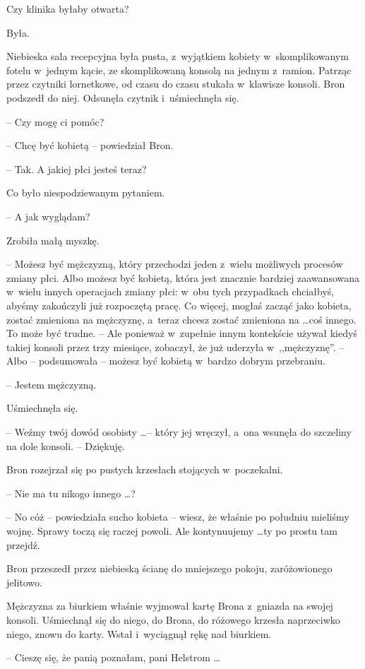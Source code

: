 \documentclass[oneside,polish,11pt,rmheadings]{mwbk}
\begin{document}
Czy klinika byłaby otwarta? 

Była. 

Niebieska sala recepcyjna była pusta, z~wyjątkiem kobiety w~skomplikowanym fotelu w~jednym kącie, ze skomplikowaną konsolą na jednym z~ramion. Patrząc przez czytniki lornetkowe, od czasu do czasu stukała w~klawisze konsoli. Bron podszedł do niej. Odsunęła czytnik i~uśmiechnęła się.

 -- Czy mogę ci pomóc? 

-- Chcę być kobietą -- powiedział Bron. 

-- Tak. A jakiej płci jesteś teraz? 

Co było niespodziewanym pytaniem. 

-- A jak wyglądam? 

Zrobiła małą myszkę. 

-- Możesz być mężczyzną, który przechodzi jeden z~wielu możliwych procesów zmiany płci. Albo możesz być kobietą, która jest znacznie bardziej zaawansowana w~wielu innych operacjach zmiany płci: w~obu tych przypadkach chciałbyś, abyśmy zakończyli już rozpoczętą pracę. Co więcej, mogłaś zacząć jako kobieta, zostać zmieniona na mężczyznę, a~teraz chcesz zostać zmieniona na \ldots  coś innego. To może być trudne. -- Ale ponieważ w~zupełnie innym kontekście używał kiedyś takiej konsoli przez trzy miesiące, zobaczył, że już uderzyła w~,,mężczyznę''. --  Albo -- podsumowała -- możesz być kobietą w~bardzo dobrym przebraniu. 

-- Jestem mężczyzną. 

Uśmiechnęła się.

 -- Weźmy twój dowód osobisty \ldots  -- który jej wręczył, a~ona wsunęła do szczeliny na dole konsoli. -- Dziękuję. 

Bron rozejrzał się po pustych krzesłach stojących w~poczekalni. 

-- Nie ma tu nikogo innego \ldots ? 

-- No cóż -- powiedziała sucho kobieta -- wiesz, że właśnie po południu mieliśmy wojnę. Sprawy toczą się raczej powoli. Ale kontynuujemy \ldots  ty po prostu tam przejdź. 

Bron przeszedł przez niebieską ścianę do mniejszego pokoju, zaróżowionego jelitowo. 

Mężczyzna za biurkiem właśnie wyjmował kartę Brona z~gniazda na swojej konsoli. Uśmiechnął się do niego, do Brona, do różowego krzesła naprzeciwko niego, znowu do karty. Wstał i~wyciągnął rękę nad biurkiem. 

-- Cieszę się, że panią poznałam, pani Helstrom \ldots  
\end{document}
